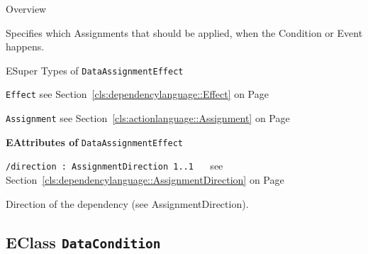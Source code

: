 	\begin{longdescription}
		\item[Overview] 		
				

	

		Specifies which Assignments that should be applied, when the Condition or Event happens.		
		\item[ESuper Types of \texttt{DataAssignmentEffect}] ~
			\begin{longdescription}
				\item[\texttt{Effect}] see Section~\ref{cls:dependencylanguage::Effect} on Page~\pageref{cls:dependencylanguage::Effect}							\item[\texttt{Assignment}] see Section~\ref{cls:actionlanguage::Assignment} on Page~\pageref{cls:actionlanguage::Assignment}						\end{longdescription}
		
	
			\item[\textbf{EAttributes of} \texttt{DataAssignmentEffect}] ~
			\begin{longdescription}
	\item[\texttt{/direction : AssignmentDirection \symbol{"5B}1..1\symbol{"5D}
}] ~
	see Section~\ref{cls:dependencylanguage::AssignmentDirection} on Page~\pageref{cls:dependencylanguage::AssignmentDirection}
	
	\nopagebreak
		
				

	

		Direction of the dependency (see AssignmentDirection).		
			\end{longdescription}
	
	\end{longdescription}
	

\subsection{EClass \bfseries \texttt{DataCondition}\normalfont}
\label{cls:dependencylanguage::DataCondition} 
	
